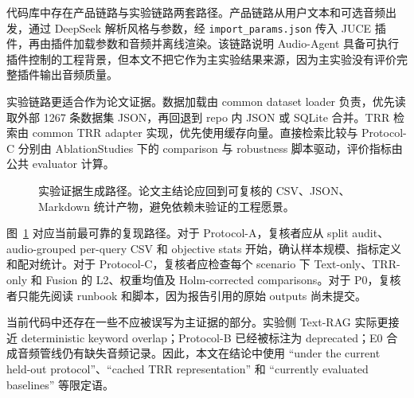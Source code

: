 代码库中存在产品链路与实验链路两套路径。产品链路从用户文本和可选音频出发，通过 DeepSeek 解析风格与参数，经 \texttt{import\_params.json} 传入 JUCE 插件，再由插件加载参数和音频并离线渲染。该链路说明 Audio-Agent 具备可执行插件控制的工程背景，但本文不把它作为主实验结果来源，因为主实验没有评价完整插件输出音频质量。

实验链路更适合作为论文证据。数据加载由 common dataset loader 负责，优先读取外部 1267 条数据集 JSON，再回退到 repo 内 JSON 或 SQLite 合并。TRR 检索由 common TRR adapter 实现，优先使用缓存向量。直接检索比较与 Protocol-C 分别由 AblationStudies 下的 comparison 与 robustness 脚本驱动，评价指标由公共 evaluator 计算。

\begin{figure}[H]
	\centering
	\caption{实验证据生成路径。论文主结论应回到可复核的 CSV、JSON、Markdown 统计产物，避免依赖未验证的工程愿景。}
	\label{fig:experiment-evidence-flow}
\end{figure}

图~\ref{fig:experiment-evidence-flow} 对应当前最可靠的复现路径。对于 Protocol-A，复核者应从 split audit、audio-grouped per-query CSV 和 objective stats 开始，确认样本规模、指标定义和配对统计。对于 Protocol-C，复核者应检查每个 scenario 下 Text-only、TRR-only 和 Fusion 的 L2、权重均值及 Holm-corrected comparisons。对于 P0，复核者只能先阅读 runbook 和脚本，因为报告引用的原始 outputs 尚未提交。

当前代码中还存在一些不应被误写为主证据的部分。实验侧 Text-RAG 实际更接近 deterministic keyword overlap；Protocol-B 已经被标注为 deprecated；E0 合成音频管线仍有缺失音频记录。因此，本文在结论中使用 “under the current held-out protocol”、“cached TRR representation” 和 “currently evaluated baselines” 等限定语。
